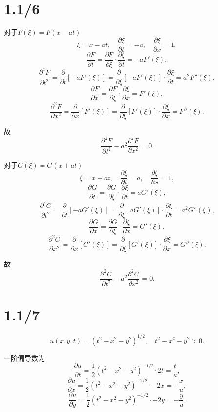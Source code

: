 \documentclass[11pt,a4paper]{article}
\author{刘逸灏 (515370910207)}
\begin{document}
\maketitle

\section{1.1/6}

对于$F(\xi)=F(x-at)$
$$\xi=x-at,\quad \frac{\partial \xi}{\partial t}=-a,\quad \frac{\partial \xi}{\partial x}=1,$$
$$\frac{\partial F}{\partial t}=\frac{\partial F}{\partial \xi}\cdot\frac{\partial \xi}{\partial t}=-aF'(\xi),$$
$$\frac{\partial^2 F}{\partial t^2}=\frac{\partial}{\partial t}[-aF'(\xi)]=\frac{\partial}{\partial \xi}[-aF'(\xi)]\cdot\frac{\partial \xi}{\partial t}=a^2F''(\xi),$$
$$\frac{\partial F}{\partial x}=\frac{\partial F}{\partial \xi}\cdot\frac{\partial \xi}{\partial x}=F'(\xi),$$
$$\frac{\partial^2 F}{\partial x^2}=\frac{\partial}{\partial x}[F'(\xi)]=\frac{\partial}{\partial \xi}[F'(\xi)]\cdot\frac{\partial \xi}{\partial x}=F''(\xi).$$

故$$\frac{\partial^2 F}{\partial t^2}-a^2\frac{\partial^2 F}{\partial x^2}=0.$$

对于$G(\xi)=G(x+at)$
$$\xi=x+at,\quad \frac{\partial \xi}{\partial t}=a,\quad \frac{\partial \xi}{\partial x}=1,$$
$$\frac{\partial G}{\partial t}=\frac{\partial G}{\partial \xi}\cdot\frac{\partial \xi}{\partial t}=aG'(\xi),$$
$$\frac{\partial^2 G}{\partial t^2}=\frac{\partial}{\partial t}[-aG'(\xi)]=\frac{\partial}{\partial \xi}[aG'(\xi)]\cdot\frac{\partial \xi}{\partial t}=a^2G''(\xi),$$
$$\frac{\partial G}{\partial x}=\frac{\partial G}{\partial \xi}\cdot\frac{\partial \xi}{\partial x}=G'(\xi),$$
$$\frac{\partial^2 G}{\partial x^2}=\frac{\partial}{\partial x}[G'(\xi)]=\frac{\partial}{\partial \xi}[G'(\xi)]\cdot\frac{\partial \xi}{\partial x}=G''(\xi).$$

故$$\frac{\partial^2 G}{\partial t^2}-a^2\frac{\partial^2 G}{\partial x^2}=0.$$

\section{1.1/7}

$$u(x,y,t)=(t^2-x^2-y^2)^{1/2},\quad t^2-x^2-y^2>0.$$

一阶偏导数为
$$\frac{\partial u}{\partial t}=\frac{1}{2}(t^2-x^2-y^2)^{-1/2}\cdot 2t=\frac{t}{u},$$
$$\frac{\partial u}{\partial x}=\frac{1}{2}(t^2-x^2-y^2)^{-1/2}\cdot -2x=-\frac{x}{u},$$
$$\frac{\partial u}{\partial y}=\frac{1}{2}(t^2-x^2-y^2)^{-1/2}\cdot -2y=-\frac{y}{u}.$$
\end{document}
